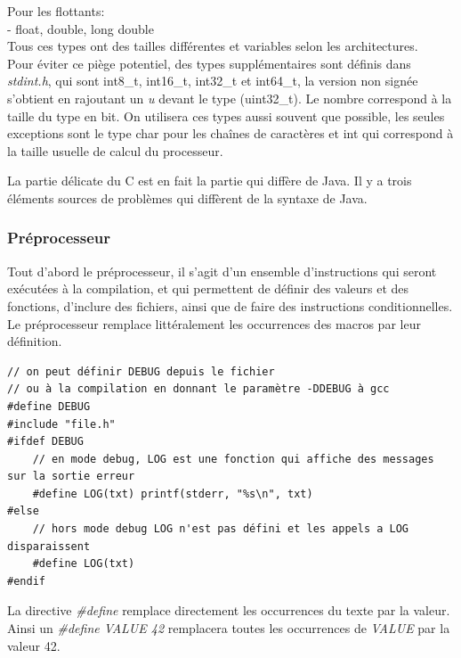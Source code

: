 \documentclass[a4paper,10pt]{article} %
\begin{document}
Pour les flottants:\\
- float, double, long double\\

Tous ces types ont des tailles différentes et variables selon les architectures.\\

Pour éviter ce piège potentiel, des types supplémentaires sont définis dans \textit{stdint.h}, qui sont int8\_t, int16\_t, int32\_t et int64\_t, la version non signée s'obtient en rajoutant un \textit{u} devant le type (uint32\_t). Le nombre correspond à la taille du type en bit. On utilisera ces types aussi souvent que possible, les seules exceptions sont le type char pour les chaînes de caractères et int qui correspond à la taille usuelle de calcul du processeur.\\

\bigskip

La partie délicate du C est en fait la partie qui diffère de Java. Il y a trois éléments sources de problèmes qui diffèrent de la syntaxe de Java.

\subsubsection{Préprocesseur}
Tout d'abord le préprocesseur, il s'agit d'un ensemble d'instructions qui seront exécutées à la compilation, et qui permettent de définir des valeurs et des fonctions, d'inclure des fichiers, ainsi que de faire des instructions conditionnelles.\\

Le préprocesseur remplace littéralement les occurrences des macros par leur définition.\\

\begin{lstlisting}[frame=single]
// on peut définir DEBUG depuis le fichier
// ou à la compilation en donnant le paramètre -DDEBUG à gcc
#define DEBUG
#include "file.h"
#ifdef DEBUG
    // en mode debug, LOG est une fonction qui affiche des messages sur la sortie erreur
    #define LOG(txt) printf(stderr, "%s\n", txt)
#else
    // hors mode debug LOG n'est pas défini et les appels a LOG disparaissent
    #define LOG(txt)
#endif
\end{lstlisting}

La directive \textit{\#define} remplace directement les occurrences du texte par la valeur. Ainsi un \textit{\#define VALUE 42} remplacera toutes les occurrences de \textit{VALUE} par la valeur 42.
\end{document}
